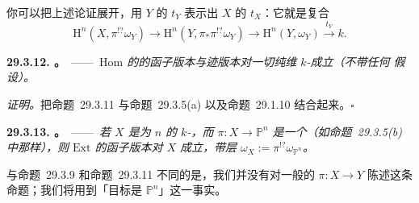 你可以把上述论证展开，用 $Y$ 的\trTraceMap{} $t_Y$ 表示出 $X$ 的\trTraceMap{} $t_X$：它就是复合
\[
\mathrm{H}^n(X,\pi^{!?}\omega_Y)\longrightarrow\mathrm{H}^n(Y,\pi_*\pi^{!?}\omega_Y)\longrightarrow\mathrm{H}^n(Y,\omega_Y)\overset{t_Y}{\longrightarrow} k.
\]

\textbf{29.3.12. \trhCorollary。}\ ——\ \emph{$\mathrm{Hom}$ 的\trSerreDuality{}的函子版本与迹版本对一切纯维\trProjective{} $k$-\trScheme{}成立（不带任何 \trCM{}假设）。}

\emph{证明。}\quad 把\mbox{命题~29.3.11} 与\mbox{命题~29.3.5(a)} 以及\mbox{命题~29.1.10} 结合起来。\hfill$\square$

\textbf{29.3.13. \trhProposition。}\ ——\ \emph{若 $X$ 是\trPureDimension{}为 $n$ 的 \trCM{} \trProjective{} $k$-\trScheme，而 $\pi\colon X\to\mathbb{P}^n$ 是一个\trFlat{}\trFinite\trMorphism（如\mbox{命题~29.3.5(b)} 中那样），则 $\mathrm{Ext}$ 的函子版本\trSerreDuality{}对 $X$ 成立，带\trCanonical{}层 $\omega_X:=\pi^{!?}\omega_{\mathbb{P}^n}$。}

与\mbox{命题~29.3.9} 和\mbox{命题~29.3.11} 不同的是，我们并没有对一般的 $\pi\colon X\to Y$ 陈述这条命题；我们将用到「目标是 $\mathbb{P}^n$」这一事实。

